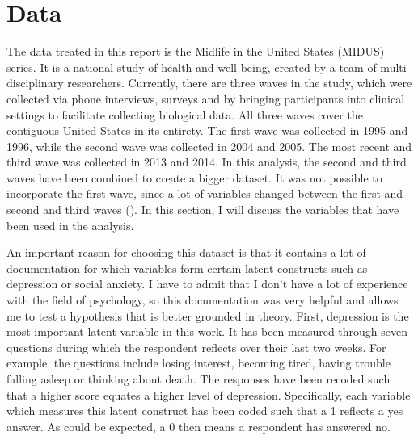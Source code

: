 \documentclass[11pt]{article}
\begin{document}
\section{Data}

The data treated in this report is the Midlife in the United States (MIDUS)
series. It is a national study of health and well-being, created by a team of
multi-disciplinary researchers. Currently, there are three waves in the study,
which were collected via phone interviews, surveys and by bringing participants
into clinical settings to facilitate collecting biological data. All three waves
cover the contiguous United States in its entirety. The first wave was collected
in 1995 and 1996, while the second wave was collected in 2004 and 2005. The most
recent and third wave was collected in 2013 and 2014. In this analysis, the
second and third waves have been combined to create a bigger dataset. It was not
possible to incorporate the first wave, since a lot of variables changed between
the first and second and third waves (\cite{radler2014}). In this section, I
will discuss the variables that have been used in the analysis.

An important reason for choosing this dataset is that it contains a lot of
documentation for which variables form certain latent constructs such as
depression or social anxiety. I have to admit that I don't have a lot of
experience with the field of psychology, so this documentation was very helpful
and allows me to test a hypothesis that is better grounded in theory. First,
depression is the most important latent variable in this work. It has been
measured through seven questions during which the respondent reflects over their
last two weeks. For example, the questions include losing interest, becoming
tired, having trouble falling asleep or thinking about death. The responses have
been recoded such that a higher score equates a higher level of depression.
Specifically, each variable which measures this latent construct has been coded
such that a 1 reflects a yes answer. As could be expected, a 0 then means a
respondent has answered no.
\end{document}
